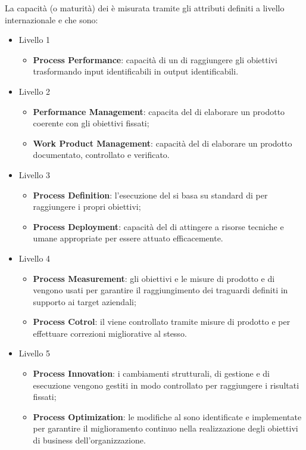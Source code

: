 La capacità (o maturità) dei  è misurata tramite gli attributi definiti a livello internazionale e che sono:
\begin{itemize}
	\item Livello 1
	\begin{itemize}
		\item \textbf{Process Performance}: capacità di un  di raggiungere gli obiettivi trasformando input identificabili in output identificabili.
	\end{itemize}
	\item Livello 2
	\begin{itemize}
		\item \textbf{Performance Management}: capacita del  di elaborare un
		prodotto coerente con gli obiettivi fissati;
		\item \textbf{Work Product Management}: capacità del  di elaborare un prodotto documentato, controllato e verificato.
	\end{itemize}
	\item Livello 3
	\begin{itemize}
		\item \textbf{Process Definition}: l'esecuzione del  si basa su standard di
		 per raggiungere i propri obiettivi;
		\item \textbf{Process Deployment}: capacità del  di attingere a risorse tecniche e umane appropriate per essere attuato efficacemente.
	\end{itemize}
	\item Livello 4
	\begin{itemize}
		\item \textbf{Process Measurement}: gli obiettivi e le misure di prodotto e di  vengono usati per garantire il raggiungimento dei traguardi definiti in supporto ai target aziendali;
		\item \textbf{Process Cotrol}: il  viene controllato tramite misure di prodotto e  per effettuare correzioni migliorative al  stesso.
	\end{itemize}
	\item Livello 5
	\begin{itemize}
		\item \textbf{Process Innovation}: i cambiamenti strutturali, di gestione e di esecuzione vengono gestiti in modo controllato per raggiungere i risultati fissati;
		\item \textbf{Process Optimization}: le modifiche al  sono identificate e implementate per garantire il miglioramento continuo nella realizzazione degli obiettivi di business dell'organizzazione.
	\end{itemize}
\end{itemize}

